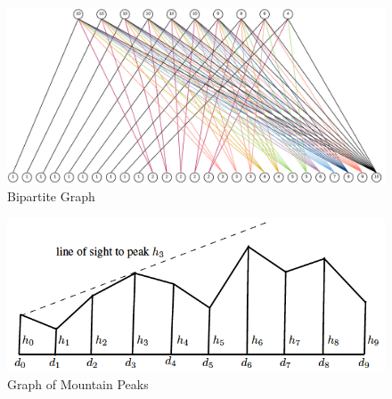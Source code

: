 \documentclass[11pt]{article}
\begin{document}
\newpage

\begin{figure}[h!]
\begin{center}
\includegraphics[scale=0.3]{Figure1.png}
\caption{Bipartite Graph}
\label{fig:bipart}
\end{center}
\end{figure}

\begin{figure}[h!]
\begin{center}
\includegraphics[scale=0.4]{Figure2.png}
\caption{Graph of Mountain Peaks}
\label{fig:peaks}
\end{center}
\end{figure}

\newpage
\end{document}
